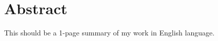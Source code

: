 \chapter*{Abstract}

\begin{english} %
This should be a 1-page summary of my work in English language.
\end{english}
